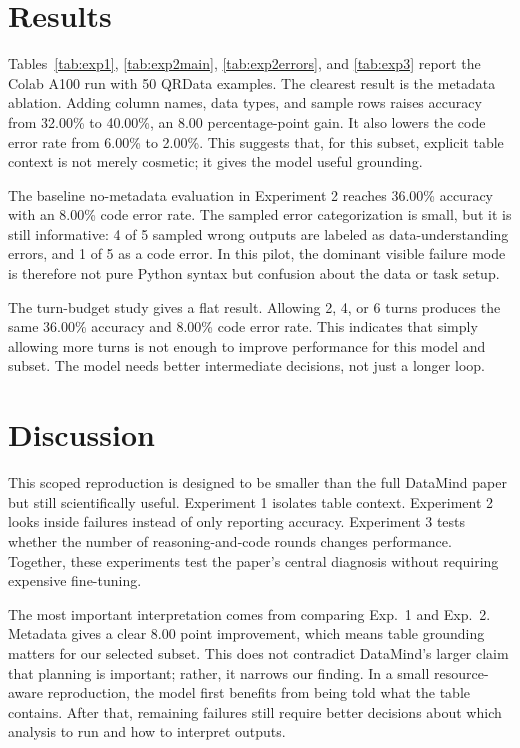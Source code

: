 \documentclass[11pt]{article}
\begin{document}
\section{Results}

Tables~\ref{tab:exp1}, \ref{tab:exp2main}, \ref{tab:exp2errors}, and \ref{tab:exp3} report the Colab A100 run with 50 QRData examples.
The clearest result is the metadata ablation.
Adding column names, data types, and sample rows raises accuracy from 32.00\% to 40.00\%, an 8.00 percentage-point gain.
It also lowers the code error rate from 6.00\% to 2.00\%.
This suggests that, for this subset, explicit table context is not merely cosmetic; it gives the model useful grounding.

The baseline no-metadata evaluation in Experiment 2 reaches 36.00\% accuracy with an 8.00\% code error rate.
The sampled error categorization is small, but it is still informative: 4 of 5 sampled wrong outputs are labeled as data-understanding errors, and 1 of 5 as a code error.
In this pilot, the dominant visible failure mode is therefore not pure Python syntax but confusion about the data or task setup.

The turn-budget study gives a flat result.
Allowing 2, 4, or 6 turns produces the same 36.00\% accuracy and 8.00\% code error rate.
This indicates that simply allowing more turns is not enough to improve performance for this model and subset.
The model needs better intermediate decisions, not just a longer loop.

\section{Discussion}

This scoped reproduction is designed to be smaller than the full DataMind paper but still scientifically useful.
Experiment 1 isolates table context.
Experiment 2 looks inside failures instead of only reporting accuracy.
Experiment 3 tests whether the number of reasoning-and-code rounds changes performance.
Together, these experiments test the paper's central diagnosis without requiring expensive fine-tuning.

The most important interpretation comes from comparing Exp.~1 and Exp.~2.
Metadata gives a clear 8.00 point improvement, which means table grounding matters for our selected subset.
This does not contradict DataMind's larger claim that planning is important; rather, it narrows our finding.
In a small resource-aware reproduction, the model first benefits from being told what the table contains.
After that, remaining failures still require better decisions about which analysis to run and how to interpret outputs.
\end{document}
